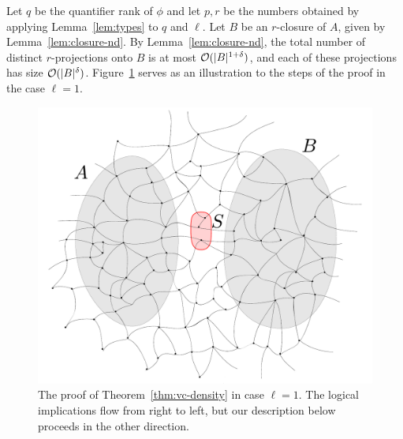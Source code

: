 	Let $q$ be the quantifier rank of $\phi$ and let 
$p,r$ be the numbers obtained by applying Lemma~\ref{lem:types} to $q$ and $\ell$.
Let $B$ be an $r$-closure of $A$, given by Lemma~\ref{lem:closure-nd}.
  By Lemma~\ref{lem:closure-nd}, the total number of distinct $r$-projections onto $B$ 
  is at most $\mathcal{O}(|B|^{1+\delta})$, and each of these projections has size $\mathcal{O}(|B|^{\delta})$.
%
  	   Figure~\ref{fig:sketch} serves as  an illustration to the steps of the proof in the case $\ell=1$.
  	   \begin{figure}[h!]
  	   	\centering
  	   		\includegraphics[width=\textwidth,page=4]{pics}
%
%
  			\caption{The proof of Theorem~\ref{thm:vc-density} in case $\ell=1$. 
  The logical implications flow from right to left,
  but our description below proceeds in the other direction.
  			}
  	   	\label{fig:sketch}
  	   \end{figure}	
	
